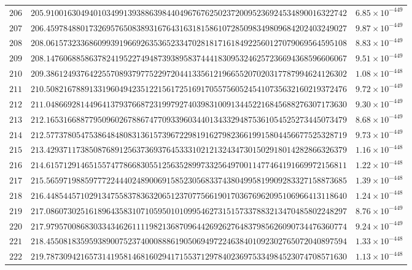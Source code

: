 \documentclass[12pt,reqno]{amsart}
\theoremstyle{remark}
\begin{document}
\begin{longtable}{clc}
$206$ & $205.9100163049401034991393886398440496767625023720095236924534890016322742$ & $6.85\times 10^{-449}$ \\
$207$ & $206.4597848801732695765083893167643163181586107285098349809684202403249027$ & $9.87\times 10^{-449}$ \\
$208$ & $208.0615732336860993919669263536523347028181716184922560127079069564595108$ & $8.83\times 10^{-449}$ \\
$209$ & $208.1476068858637824195227494873938958374441830953246257236694368596606067$ & $9.51\times 10^{-449}$ \\
$210$ & $209.3861249376422557089379775229720441335612196655207020317787994624126302$ & $1.08\times 10^{-448}$ \\
$211$ & $210.5082167889133196049423512215617251691705575605245410735632160219372476$ & $9.72\times 10^{-449}$ \\
$212$ & $211.0486692814496413793766872319979274039831009134452216845688276307173630$ & $9.30\times 10^{-449}$ \\
$213$ & $212.1653166887795096026788674770933960344013433294875361054525273445073479$ & $8.68\times 10^{-449}$ \\
$214$ & $212.5773780547538648480831361573967229819162798236619915804456677525328719$ & $9.73\times 10^{-449}$ \\
$215$ & $213.4293711738508768912563736937645333102121324347301502918014282866326379$ & $1.16\times 10^{-448}$ \\
$216$ & $214.6157129146515574778668305512563528997332564970011477464191669972156811$ & $1.22\times 10^{-448}$ \\
$217$ & $215.5659719885977722444024890069158523056833743804995819909283327158873685$ & $1.39\times 10^{-448}$ \\
$218$ & $216.4485445710291347558378363206512370775661901703676962095106966413118640$ & $1.24\times 10^{-448}$ \\
$219$ & $217.0860730251618964358310710595010109954627315157337883213470485802248297$ & $8.76\times 10^{-449}$ \\
$220$ & $217.9795700868303343462611119821368709644269262764837985626090734476360774$ & $9.24\times 10^{-449}$ \\
$221$ & $218.4550818359593890075237400088861905069497224638401092302765072040897594$ & $1.33\times 10^{-448}$ \\
$222$ & $219.7873094216573141958146816029417155371297840236975334984523074708571630$ & $1.13\times 10^{-448}$ \\

\end{longtable}
\end{document}
